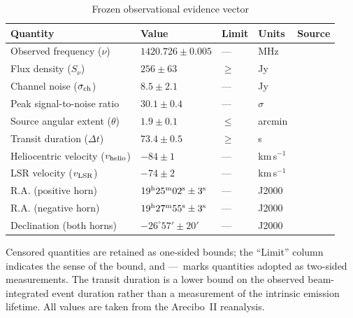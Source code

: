 \documentclass[crop]{CSL}
\newcommand{\snu}{S_\nu}
\begin{document}
\begin{table}[ht!]
\centering
\caption{Frozen observational evidence vector}
\label{tab:obs_vector}
\small
\setlength{\tabcolsep}{4pt}
\begin{tabular}{@{}
>{\raggedright\arraybackslash}p{}
>{\centering\arraybackslash}p{}
>{\centering\arraybackslash}p{}
>{\raggedright\arraybackslash}p{}
>{\raggedright\arraybackslash}p{}
@{}}
\hline Quantity & Value & Limit & Units & Source \\ \hline\hline
Observed frequency ($\nu$)
& $1420.726\pm0.005$ & --- & MHz & \citet{mendez2025}\\
Flux density ($\snu$)
& $256\pm63$ & $\geq$ & Jy & \citet{mendez2025}\\
Channel noise ($\sigma_{\rm ch}$)
& $8.5\pm2.1$ & --- & Jy & \citet{mendez2025}\\
Peak signal-to-noise ratio
& $30.1\pm0.4$ & --- & $\sigma$ & \citet{mendez2025}\\
Source angular extent ($\theta$)
& $1.9\pm0.1$ & $\leq$ & arcmin & \citet{mendez2025}\\
Transit duration ($\Delta t$)
& $73.4\pm0.5$ & $\geq$ & s & \citet{mendez2025}\\
Heliocentric velocity ($v_{\rm helio}$)
& $-84\pm1$ & --- & km\,s$^{-1}$ & \citet{mendez2025}\\
LSR velocity ($v_{\rm LSR}$)
& $-74\pm2$ & --- & km\,s$^{-1}$ & \citet{mendez2025}\\
R.A. (positive horn)
& $19^{\rm h}25^{\rm m}02^{\rm s}\pm3^{\rm s}$ & --- & J2000 & \citet{mendez2025}\\
R.A. (negative horn)
& $19^{\rm h}27^{\rm m}55^{\rm s}\pm3^{\rm s}$ & --- & J2000 & \citet{mendez2025}\\
Declination (both horns)
& $-26^\circ57'\pm20'$ & --- & J2000 & \citet{mendez2025}\\
\end{tabular}

\par {\small Censored quantities are retained as one-sided bounds; the ``Limit'' column indicates the sense of the bound, and ---\ marks quantities adopted as two-sided measurements. The transit duration is a lower bound on the observed beam-integrated event duration rather than a measurement of the intrinsic emission lifetime. All values are taken from the Arecibo~II reanalysis.}
\end{table}
\end{document}
